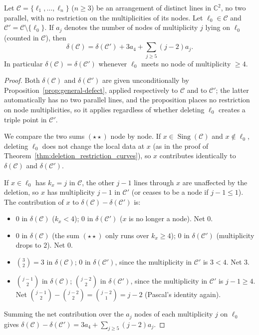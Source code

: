 \documentclass[article,11pt]{amsart} \numberwithin{equation}{section}
\numberwithin{equation}{section}
\begin{document}
{\begin{inp}
	\label{cor:defectrecursion}
	Let $\mathcal C=\{\ell_1,\dots,\ell_n\}$ ($n\ge3$) be an arrangement of
	distinct lines in $\mathbb{C}^2$, no two parallel, with no restriction on the
	multiplicities of its nodes. Let $\ell_0\in\mathcal C$ and
	$\mathcal C'=\mathcal C\setminus\{\ell_0\}$. If $a_j$ denotes the number of
	nodes of multiplicity $j$ lying on $\ell_0$ (counted in $\mathcal C$), then
	\[
	\delta(\mathcal C)=\delta(\mathcal C')+3a_4+\sum_{j\ge5}(j-2)a_j .
	\]
	In particular $\delta(\mathcal C)=\delta(\mathcal C')$ whenever $\ell_0$
	meets no node of multiplicity $\ge4$.
\end{inp}

\begin{proof}
	Both $\delta(\mathcal C)$ and $\delta(\mathcal C')$ are given unconditionally
	by Proposition~\ref{prop:general-defect}, applied respectively to $\mathcal C$
	and to $\mathcal C'$; the latter automatically has no two parallel lines, and
	the proposition places no restriction on node multiplicities, so it applies
	regardless of whether deleting $\ell_0$ creates a triple point in
	$\mathcal C'$.
	
	We compare the two sums $(\star\star)$ node by node. If
	$x\in \operatorname{Sing}(\mathcal C)$ and $x\notin\ell_0$, deleting $\ell_0$ does not
	change the local data at $x$ (as in the proof of Theorem~\ref{thm:deletion_restriction_curves}), so $x$
	contributes identically to $\delta(\mathcal C)$ and $\delta(\mathcal C')$.
	
	If $x\in\ell_0$ has $k_x=j$ in $\mathcal C$, the other $j-1$ lines through
	$x$ are unaffected by the deletion, so $x$ has multiplicity $j-1$ in
	$\mathcal C'$ (or ceases to be a node if $j-1\le1$). The contribution of $x$
	to $\delta(\mathcal C)-\delta(\mathcal C')$ is:
	
	\begin{itemize}
		\item[$j=2$:] $0$ in $\delta(\mathcal C)$ ($k_x<4$); $0$ in
		$\delta(\mathcal C')$ ($x$ is no longer a node). Net $0$.
		\item[$j=3$:] $0$ in $\delta(\mathcal C)$ (the sum $(\star\star)$ only runs
		over $k_x\ge4$); $0$ in $\delta(\mathcal C')$ (multiplicity drops to $2$).
		Net $0$.
		\item[$j=4$:] $\binom32=3$ in $\delta(\mathcal C)$; $0$ in
		$\delta(\mathcal C')$, since the multiplicity in $\mathcal C'$ is
		$3<4$. Net $3$.
		\item[$j\ge5$:] $\binom{j-1}2$ in $\delta(\mathcal C)$; $\binom{j-2}2$ in
		$\delta(\mathcal C')$, since the multiplicity in $\mathcal C'$ is
		$j-1\ge4$. Net $\binom{j-1}2-\binom{j-2}2=\binom{j-2}1=j-2$ (Pascal's
		identity again).
	\end{itemize}
	Summing the net contribution over the $a_j$ nodes of each multiplicity $j$ on
	$\ell_0$ gives $\delta(\mathcal C)-\delta(\mathcal C')=3a_4+\sum_{j\ge5}(j-2)a_j$.
\end{proof}

}
\end{document}

